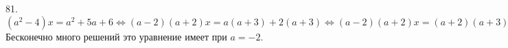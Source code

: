81. $(a^2-4)x=a^2+5a+6\Leftrightarrow (a-2)(a+2)x=a(a+3)+2(a+3)\Leftrightarrow(a-2)(a+2)x=(a+2)(a+3).$ Бесконечно много решений это уравнение имеет при $a=-2.$\\
